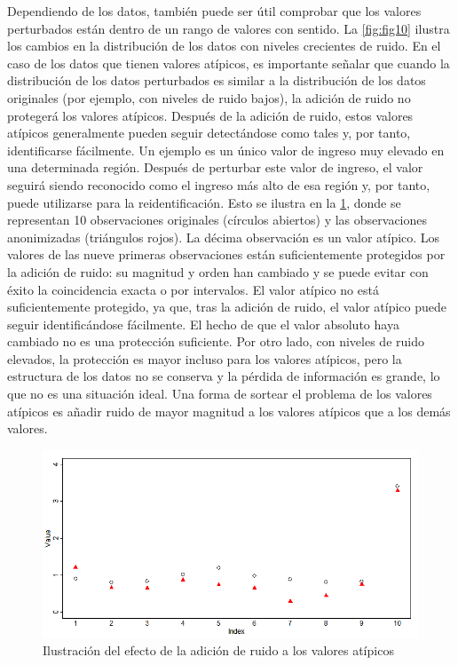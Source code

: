 \documentclass[]{book}
\theoremstyle{definition}
\theoremstyle{definition}
\theoremstyle{definition}
\theoremstyle{definition}
\theoremstyle{remark}
\begin{document}
Dependiendo de los datos, también puede ser útil comprobar que los valores perturbados están dentro de un rango de valores con sentido. La \ref{fig:fig10} ilustra los cambios en la distribución de los datos con niveles crecientes de ruido. En el caso de los datos que tienen valores atípicos, es importante señalar que cuando la distribución de los datos perturbados es similar a la distribución de los datos originales (por ejemplo, con niveles de ruido bajos), la adición de ruido no protegerá los valores atípicos. Después de la adición de ruido, estos valores atípicos generalmente pueden seguir detectándose como tales y, por tanto, identificarse fácilmente. Un ejemplo es un único valor de ingreso muy elevado en una determinada región. Después de perturbar este valor de ingreso, el valor seguirá siendo reconocido como el ingreso más alto de esa región y, por tanto, puede utilizarse para la reidentificación. Esto se ilustra en la \ref{fig:fig9}, donde se representan 10 observaciones originales (círculos abiertos) y las observaciones anonimizadas (triángulos rojos). La décima observación es un valor atípico. Los valores de las nueve primeras observaciones están suficientemente protegidos por la adición de ruido: su magnitud y orden han cambiado y se puede evitar con éxito la coincidencia exacta o por intervalos. El valor atípico no está suficientemente protegido, ya que, tras la adición de ruido, el valor atípico puede seguir identificándose fácilmente. El hecho de que el valor absoluto haya cambiado no es una protección suficiente. Por otro lado, con niveles de ruido elevados, la protección es mayor incluso para los valores atípicos, pero la estructura de los datos no se conserva y la pérdida de información es grande, lo que no es una situación ideal. Una forma de sortear el problema de los valores atípicos es añadir ruido de mayor magnitud a los valores atípicos que a los demás valores.

\begin{figure}
\includegraphics[width=1\linewidth]{Imagenes/image8} \caption{Ilustración del efecto de la adición de ruido a los valores atípicos}\label{fig:fig9}
\end{figure}
\end{document}
